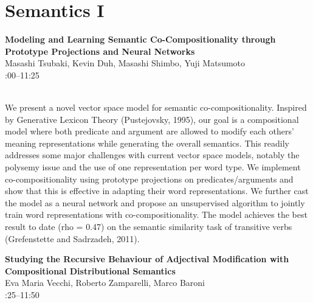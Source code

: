 \documentclass[twoside,makeidx]{book}
\renewcommand{\normalsize}{\fontsize{8}{9}\selectfont}
\renewcommand{\small}{\fontsize{7}{8}\selectfont}
\begin{document}
\section{Semantics I}
\vspace{-1em}
\par\vspace{2em}\noindent%
\begin{minipage}{\linewidth}%
\begin{center}
\textbf{\normalsize Modeling and Learning Semantic Co-Compositionality through Prototype Projections and Neural Networks}\\
\normalsize  Masashi Tsubaki,  Kevin Duh,  Masashi Shimbo,  Yuji Matsumoto\\
{\small 11:00--11:25}\\
\end{center}
\end{minipage}\\[0.5em]
\nopagebreak%
\noindent%
{\small We present a novel vector space model for semantic co-compositionality. Inspired by Generative Lexicon Theory (Pustejovsky, 1995), our goal is a compositional model where both predicate and argument are allowed to modify each others' meaning representations while generating the overall semantics. This readily addresses some major challenges with current vector space models, notably the polysemy issue and the use of one representation per word type. We implement co-compositionality using prototype projections on predicates/arguments and show that this is effective in adapting their word representations. We further cast the model as a neural network and propose an unsupervised algorithm to jointly train word representations with co-compositionality. The model achieves the best result to date (rho = 0.47) on the semantic similarity task of transitive verbs (Grefenstette and Sadrzadeh, 2011).}
\par\vspace{2em}\noindent%
\begin{minipage}{\linewidth}%
\begin{center}
\textbf{\normalsize Studying the Recursive Behaviour of Adjectival Modification with Compositional Distributional Semantics}\\
\normalsize  Eva Maria Vecchi,  Roberto Zamparelli,  Marco Baroni\\
{\small 11:25--11:50}\\
\end{center}
\end{minipage}\\[0.5em]
\end{document}
